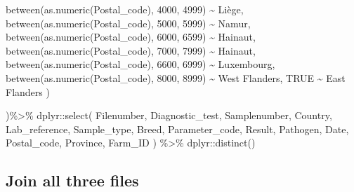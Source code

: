 \documentclass[
]{article}
\newenvironment{Shaded}{\begin{snugshade}}{\end{snugshade}}
\newcommand{\ConstantTok}[1]{\textcolor[rgb]{0.00,0.00,0.00}{#1}}
\newcommand{\DecValTok}[1]{\textcolor[rgb]{0.00,0.00,0.81}{#1}}
\newcommand{\FunctionTok}[1]{\textcolor[rgb]{0.00,0.00,0.00}{#1}}
\newcommand{\NormalTok}[1]{#1}
\newcommand{\SpecialCharTok}[1]{\textcolor[rgb]{0.00,0.00,0.00}{#1}}
\newcommand{\StringTok}[1]{\textcolor[rgb]{0.31,0.60,0.02}{#1}}
\begin{document}
\begin{Shaded}
\begin{Highlighting}[]
        \FunctionTok{between}\NormalTok{(}\FunctionTok{as.numeric}\NormalTok{(Postal\_code), }\DecValTok{4000}\NormalTok{, }\DecValTok{4999}\NormalTok{) }\SpecialCharTok{\textasciitilde{}} \StringTok{\textquotesingle{}Liège\textquotesingle{}}\NormalTok{,}
        \FunctionTok{between}\NormalTok{(}\FunctionTok{as.numeric}\NormalTok{(Postal\_code), }\DecValTok{5000}\NormalTok{, }\DecValTok{5999}\NormalTok{) }\SpecialCharTok{\textasciitilde{}} \StringTok{\textquotesingle{}Namur\textquotesingle{}}\NormalTok{,}
        \FunctionTok{between}\NormalTok{(}\FunctionTok{as.numeric}\NormalTok{(Postal\_code), }\DecValTok{6000}\NormalTok{, }\DecValTok{6599}\NormalTok{) }\SpecialCharTok{\textasciitilde{}} \StringTok{\textquotesingle{}Hainaut\textquotesingle{}}\NormalTok{,}
        \FunctionTok{between}\NormalTok{(}\FunctionTok{as.numeric}\NormalTok{(Postal\_code), }\DecValTok{7000}\NormalTok{, }\DecValTok{7999}\NormalTok{) }\SpecialCharTok{\textasciitilde{}} \StringTok{\textquotesingle{}Hainaut\textquotesingle{}}\NormalTok{,}
        \FunctionTok{between}\NormalTok{(}\FunctionTok{as.numeric}\NormalTok{(Postal\_code), }\DecValTok{6600}\NormalTok{, }\DecValTok{6999}\NormalTok{) }\SpecialCharTok{\textasciitilde{}} \StringTok{\textquotesingle{}Luxembourg\textquotesingle{}}\NormalTok{,}
        \FunctionTok{between}\NormalTok{(}\FunctionTok{as.numeric}\NormalTok{(Postal\_code), }\DecValTok{8000}\NormalTok{, }\DecValTok{8999}\NormalTok{) }\SpecialCharTok{\textasciitilde{}} \StringTok{\textquotesingle{}West Flanders\textquotesingle{}}\NormalTok{,}
        \ConstantTok{TRUE} \SpecialCharTok{\textasciitilde{}} \StringTok{\textquotesingle{}East Flanders\textquotesingle{}}
\NormalTok{            )}
  
\NormalTok{  )}\SpecialCharTok{\%\textgreater{}\%}
\NormalTok{  dplyr}\SpecialCharTok{::}\FunctionTok{select}\NormalTok{(}
\NormalTok{    Filenumber,}
\NormalTok{    Diagnostic\_test,}
\NormalTok{    Samplenumber,}
\NormalTok{    Country,}
\NormalTok{    Lab\_reference,}
\NormalTok{    Sample\_type,}
\NormalTok{    Breed,}
\NormalTok{    Parameter\_code,}
\NormalTok{    Result,}
\NormalTok{    Pathogen,}
\NormalTok{    Date,}
\NormalTok{    Postal\_code,}
\NormalTok{    Province,}
\NormalTok{    Farm\_ID}
\NormalTok{  ) }\SpecialCharTok{\%\textgreater{}\%}
\NormalTok{  dplyr}\SpecialCharTok{::}\FunctionTok{distinct}\NormalTok{()}
\end{Highlighting}
\end{Shaded}

\hypertarget{join-all-three-files}{%
\subsection{Join all three files}\label{join-all-three-files}}
\end{document}
